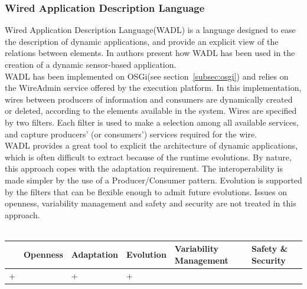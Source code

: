 \subsubsection{Wired Application Description Language}
Wired Application Description Language(WADL) is a language designed to ease the description of dynamic applications, and provide an explicit view of the relations between elements. In \cite{Cervantes:2008} authors present how WADL has been used in the creation of a dynamic sensor-based application.\\
WADL has been implemented on OSGi(see section~\ref{subsec:osgi}) and relies on the WireAdmin service offered by the execution platform. In this implementation, wires between producers of information and consumers are dynamically created or deleted, according to the elements available in the system. Wires are specified by two filters. Each filter is used to make a selection among all available services, and capture producers' (or consumers') services required for the wire.\\

WADL provides a great tool to explicit the architecture of dynamic applications, which is often difficult to extract because of the runtime evolutions. By nature, this approach copes with the adaptation requirement. The interoperability is made simpler by the use of a Producer/Consumer pattern. Evolution is supported by the filters that can be flexible enough to admit future evolutions. Issues on openness, variability management and safety and security are not treated in this approach.\\
\\
\begin{tabular}{ >{\centering}m{}| >{\centering}m{} >{\centering}m{}| >{\centering}m{} >{\centering}m{}| >{\centering\arraybackslash}m{}}
{\tiny Interoperability} & {\tiny Openness} & {\tiny Adaptation} & {\tiny Evolution} & {\tiny Variability Management} & {\tiny Safety \& Security}\\
 \hline
 + &  & + & + &  & \\ 
  \hline
\end{tabular}\\


